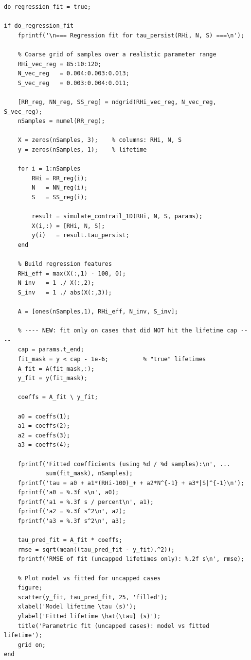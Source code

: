 \documentclass[11pt]{article}
\begin{document}
\begin{verbatim}
do_regression_fit = true;

if do_regression_fit
    fprintf('\n=== Regression fit for tau_persist(RHi, N, S) ===\n');

    % Coarse grid of samples over a realistic parameter range
    RHi_vec_reg = 85:10:120;
    N_vec_reg   = 0.004:0.003:0.013;
    S_vec_reg   = 0.003:0.004:0.011;

    [RR_reg, NN_reg, SS_reg] = ndgrid(RHi_vec_reg, N_vec_reg, S_vec_reg);
    nSamples = numel(RR_reg);

    X = zeros(nSamples, 3);    % columns: RHi, N, S
    y = zeros(nSamples, 1);    % lifetime

    for i = 1:nSamples
        RHi = RR_reg(i);
        N   = NN_reg(i);
        S   = SS_reg(i);

        result = simulate_contrail_1D(RHi, N, S, params);
        X(i,:) = [RHi, N, S];
        y(i)   = result.tau_persist;
    end

    % Build regression features
    RHi_eff = max(X(:,1) - 100, 0);
    N_inv   = 1 ./ X(:,2);
    S_inv   = 1 ./ abs(X(:,3));

    A = [ones(nSamples,1), RHi_eff, N_inv, S_inv];

    % ---- NEW: fit only on cases that did NOT hit the lifetime cap ----
    cap = params.t_end;
    fit_mask = y < cap - 1e-6;          % "true" lifetimes
    A_fit = A(fit_mask,:);
    y_fit = y(fit_mask);

    coeffs = A_fit \ y_fit;

    a0 = coeffs(1);
    a1 = coeffs(2);
    a2 = coeffs(3);
    a3 = coeffs(4);

    fprintf('Fitted coefficients (using %d / %d samples):\n', ...
            sum(fit_mask), nSamples);
    fprintf('tau = a0 + a1*(RHi-100)_+ + a2*N^{-1} + a3*|S|^{-1}\n');
    fprintf('a0 = %.3f s\n', a0);
    fprintf('a1 = %.3f s / percent\n', a1);
    fprintf('a2 = %.3f s^2\n', a2);
    fprintf('a3 = %.3f s^2\n', a3);

    tau_pred_fit = A_fit * coeffs;
    rmse = sqrt(mean((tau_pred_fit - y_fit).^2));
    fprintf('RMSE of fit (uncapped lifetimes only): %.2f s\n', rmse);

    % Plot model vs fitted for uncapped cases
    figure;
    scatter(y_fit, tau_pred_fit, 25, 'filled');
    xlabel('Model lifetime \tau (s)');
    ylabel('Fitted lifetime \hat{\tau} (s)');
    title('Parametric fit (uncapped cases): model vs fitted lifetime');
    grid on;
end




\end{verbatim}
\end{document}
